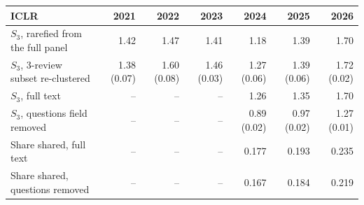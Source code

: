\begin{tabular}{lrrrrrr}
\toprule
ICLR & 2021 & 2022 & 2023 & 2024 & 2025 & 2026 \\
\midrule
$S_3$, rarefied from the full panel & 1.42 & 1.47 & 1.41 & 1.18 & 1.39 & 1.70 \\
$S_3$, 3-review subset re-clustered & 1.38 (0.07) & 1.60 (0.08) & 1.46 (0.03) & 1.27 (0.06) & 1.39 (0.06) & 1.72 (0.02) \\
$S_3$, full text & -- & -- & -- & 1.26 & 1.35 & 1.70 \\
$S_3$, questions field removed & -- & -- & -- & 0.89 (0.02) & 0.97 (0.02) & 1.27 (0.01) \\
Share shared, full text & -- & -- & -- & 0.177 & 0.193 & 0.235 \\
Share shared, questions removed & -- & -- & -- & 0.167 & 0.184 & 0.219 \\
\bottomrule
\end{tabular}
